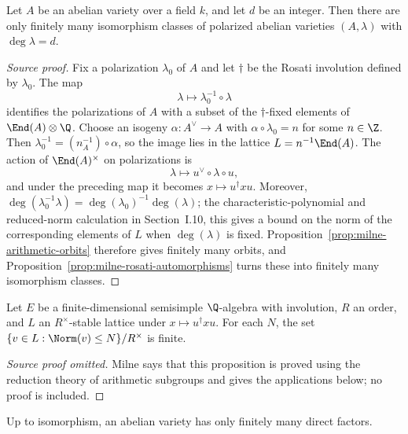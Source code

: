 \begin{theorem}\label{thm:milne-finite-polarizations}
Let $A$ be an abelian variety over a field $k$, and let $d$ be an integer.
Then there are only finitely many isomorphism classes of polarized abelian
varieties $(A,\lambda)$ with $\deg\lambda=d$.
\end{theorem}
\begin{proof}[Source proof]
Fix a polarization $\lambda_0$ of $A$ and let $\dagger$ be the Rosati
involution defined by $\lambda_0$.  The map
\[
\lambda\longmapsto\lambda_0^{-1}\circ\lambda
\]
identifies the polarizations of $A$ with a subset of the $\dagger$-fixed
elements of $\End(A)\otimes\Q$.  Choose an isogeny $\alpha:A^\vee\to A$
with $\alpha\circ\lambda_0=n$ for some $n\in\Z$.  Then
$\lambda_0^{-1}=(n_A^{-1})\circ\alpha$, so the image lies in the lattice
$L=n^{-1}\End(A)$.  The action of $\End(A)^\times$ on polarizations is
\[
\lambda\longmapsto u^\vee\circ\lambda\circ u,
\]
and under the preceding map it becomes $x\mapsto u^\dagger xu$.
Moreover, $\deg(\lambda_0^{-1}\lambda)=\deg(\lambda_0)^{-1}\deg(\lambda)$;
the characteristic-polynomial and reduced-norm calculation in Section~I.10,
this gives a bound on the norm of the corresponding elements of $L$ when
$\deg(\lambda)$ is fixed.  Proposition~\ref{prop:milne-arithmetic-orbits} therefore gives
finitely many orbits, and Proposition~\ref{prop:milne-rosati-automorphisms}
turns these into finitely many isomorphism classes.
\end{proof}
\begin{proposition}\label{prop:milne-arithmetic-orbits}
Let $E$ be a finite-dimensional semisimple $\Q$-algebra with involution, $R$ an order, and $L$ an $R^\times$-stable lattice under $x\mapsto u^\dagger xu$. For each $N$, the set $\{v\in L:\Norm(v)\le N\}/R^\times$ is finite.
\end{proposition}
\begin{proof}[Source proof omitted]
Milne says that this proposition is proved using the reduction theory of
arithmetic subgroups and gives the applications below; no proof is included.
\end{proof}
\begin{theorem}\label{thm:milne-finite-direct-factors}
Up to isomorphism, an abelian variety has only finitely many direct factors.
\end{theorem}

